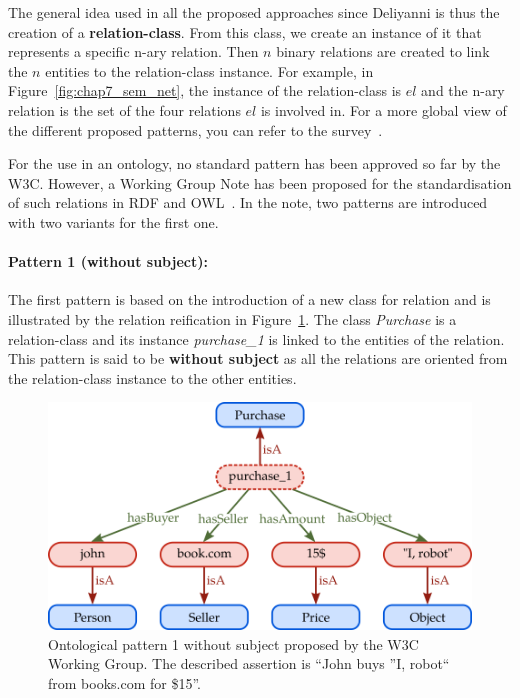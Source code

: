 The general idea used in all the proposed approaches since Deliyanni is thus the creation of a \textbf{relation-class}. From this class, we create an instance of it that represents a specific n-ary relation. Then $n$ binary relations are created to link the $n$ entities to the relation-class instance. For example, in Figure~\ref{fig:chap7_sem_net}, the instance of the relation-class is $el$ and the n-ary relation is the set of the four relations $el$ is involved in. For a more global view of the different proposed patterns, you can refer to the survey~\cite{gangemi_2013_multi}.

For the use in an ontology, no standard pattern has been approved so far by the W3C. However, a Working Group Note has been proposed for the standardisation of such relations in RDF and OWL~\cite{w3c_2006_defining}. In the note, two patterns are introduced with two variants for the first one.

\paragraph{Pattern 1 (without subject):} The first pattern is based on the introduction of a new class for relation and is illustrated by the relation reification in Figure~\ref{fig:chap7_w3c_p2}. The class \textit{Purchase} is a relation-class and its instance \textit{purchase\_1} is linked to the entities of the relation. This pattern is said to be \textbf{without subject} as all the relations are oriented from the relation-class instance to the other entities.

\begin{figure}[ht!]
\centering
\includegraphics[scale=0.45]{figures/chapter7/w3c_p2.png}
\caption{\label{fig:chap7_w3c_p2} Ontological pattern 1 without subject proposed by the W3C Working Group. The described assertion is ``John buys ''I, robot`` from books.com for \$15''.}
\end{figure}

